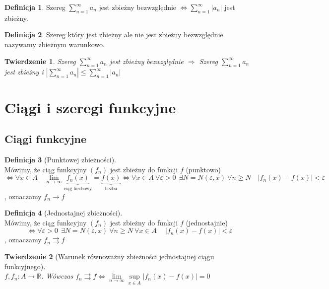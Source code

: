 \documentclass[12pt,a4paper]{article}
\newtheorem{tw}{Twierdzenie}
\theoremstyle{definition}
\newtheorem{df}{Definicja}
\begin{document}
\begin{df}
Szereg $\sum\limits_{n=1}^\infty a_n$ jest zbieżny bezwzględnie $\Leftrightarrow \sum\limits_{n=1}^\infty |a_n|$ jest zbieżny.
\end{df}

\begin{df}
Szereg który jest zbieżny ale nie jest zbieżny bezwzględnie nazywamy zbieżnym warunkowo.
\end{df}

\begin{tw}
Szereg $\sum\limits_{n=1}^\infty a_n$ jest zbieżny bezwzględnie $\Rightarrow$ Szereg $\sum\limits_{n=1}^\infty a_n$ jest zbieżny i $|\sum\limits_{n=1}^\infty a_n| \leqslant \sum\limits_{n=1}^\infty |a_n|$ 
\end{tw}





\section{Ciągi i szeregi funkcyjne}
\subsection{Ciągi funkcyjne}
\begin{df}[Punktowej zbieżności]~\\
Mówimy, że ciąg funkcyjny $(f_n)$ jest zbieżny do funkcji $f$ (punktowo)
 $$\Leftrightarrow \forall x\in A \quad \lim\limits_{n\to\infty}\underbrace{f_n(x)}_{\text{ciąg liczbowy}} = \underbrace{f(x)}_{\text{liczba}} \Leftrightarrow \forall x\in A ~ \forall\varepsilon > 0 ~~ \exists N = N(\varepsilon, x) ~ \forall n \geqslant N \quad |f_n(x)-f(x)| < \varepsilon$$, oznaczamy $f_n \rightarrow f$
\end{df}

\begin{df}[Jednostajnej zbieżności]~\\
Mówimy, że ciąg funkcyjny $(f_n)$ jest zbieżny do funkcji $f$ (jednostajnie) $$\Leftrightarrow \forall\varepsilon > 0 ~~ \exists N = N(\varepsilon, x) ~ \forall n \geqslant N ~ \forall x\in A ~ \quad |f_n(x)-f(x)| < \varepsilon$$, oznaczamy $f_n \rightrightarrows f$
\end{df}

\begin{tw}[Warunek równoważny zbieżności jednostajnej ciągu funkcyjnego]~\\
$f, f_n: A \to \mathbb{R}$. Wówczas $f_n \rightrightarrows f \Leftrightarrow \lim\limits_{n\to\infty} \sup\limits_{x\in A} |f_n(x)-f(x)| = 0$
\end{tw}
\end{document}
